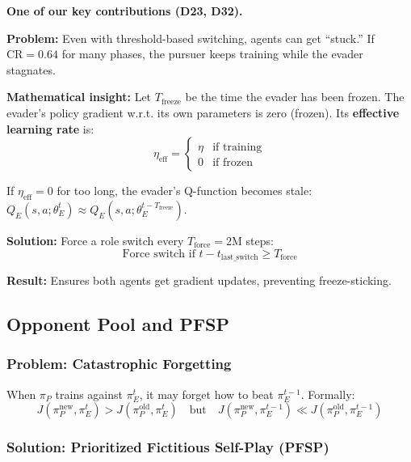 \documentclass[11pt,a4paper]{report}
\begin{document}
\begin{decisionbox}
\textbf{One of our key contributions (D23, D32).}

\textbf{Problem:} Even with threshold-based switching, agents can get ``stuck.'' If $\text{CR} = 0.64$ for many phases, the pursuer keeps training while the evader stagnates.

\textbf{Mathematical insight:} Let $T_{\text{freeze}}$ be the time the evader has been frozen. The evader's policy gradient w.r.t. its own parameters is zero (frozen). Its \textbf{effective learning rate} is:
\begin{equation}
    \eta_{\text{eff}} = \begin{cases} \eta & \text{if training} \\ 0 & \text{if frozen} \end{cases}
\end{equation}

If $\eta_{\text{eff}} = 0$ for too long, the evader's Q-function becomes stale: $Q_E(s,a; \theta_E^t) \approx Q_E(s,a; \theta_E^{t-T_{\text{freeze}}})$.

\textbf{Solution:} Force a role switch every $T_{\text{force}} = 2\text{M}$ steps:
\begin{equation}
    \text{Force switch if } t - t_{\text{last\_switch}} \geq T_{\text{force}}
\end{equation}

\textbf{Result:} Ensures both agents get gradient updates, preventing freeze-sticking.
\end{decisionbox}

\subsection{Opponent Pool and PFSP}

\subsubsection{Problem: Catastrophic Forgetting}

When $\pi_P$ trains against $\pi_E^t$, it may forget how to beat $\pi_E^{t-1}$. Formally:
\begin{equation}
    J(\pi_P^{\text{new}}, \pi_E^t) > J(\pi_P^{\text{old}}, \pi_E^t) \quad \text{but} \quad J(\pi_P^{\text{new}}, \pi_E^{t-1}) \ll J(\pi_P^{\text{old}}, \pi_E^{t-1})
\end{equation}

\subsubsection{Solution: Prioritized Fictitious Self-Play (PFSP)}
\end{document}
